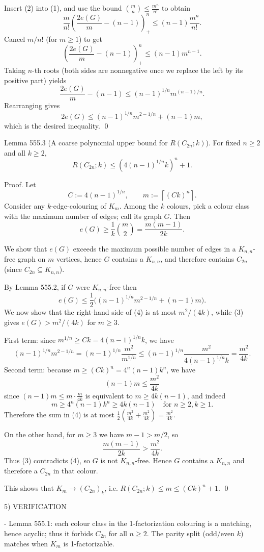 Insert (2) into (1), and use the bound $\binom{m}{n}\le \frac{m^n}{n!}$ to obtain
\[
\frac{m}{n!}\left(\frac{2e(G)}{m}-(n-1)\right)_+^n\le (n-1)\frac{m^n}{n!}.
\]
Cancel $m/n!$ (for $m\ge 1$) to get
\[
\left(\frac{2e(G)}{m}-(n-1)\right)_+^n\le (n-1)m^{n-1}.
\]
Taking $n$-th roots (both sides are nonnegative once we replace the left by its positive part) yields
\[
\frac{2e(G)}{m}-(n-1)\le (n-1)^{1/n} m^{(n-1)/n}.
\]
Rearranging gives
\[
2e(G)\le (n-1)^{1/n} m^{2-1/n}+(n-1)m,
\]
which is the desired inequality.
\qed

Lemma 555.3 (A coarse polynomial upper bound for $R(C_{2n};k)$).
For fixed $n\ge 2$ and all $k\ge 2$,
\[
R(C_{2n};k)\le \left(4(n-1)^{1/n}k\right)^n+1.
\]

Proof.
Let
\[
C:=4(n-1)^{1/n},\qquad m:=\left\lceil (Ck)^n\right\rceil.
\]
Consider any $k$-edge-colouring of $K_m$.
Among the $k$ colours, pick a colour class with the maximum number of edges; call its graph $G$.
Then
\[
e(G)\ge \frac{1}{k}\binom{m}{2}=\frac{m(m-1)}{2k}.
\tag{3}
\]

We show that $e(G)$ exceeds the maximum possible number of edges in a $K_{n,n}$-free graph on $m$ vertices, hence $G$ contains a $K_{n,n}$, and therefore contains $C_{2n}$ (since $C_{2n}\subseteq K_{n,n}$).

By Lemma 555.2, if $G$ were $K_{n,n}$-free then
\[
e(G)\le \frac12\Big((n-1)^{1/n} m^{2-1/n}+(n-1)m\Big).
\tag{4}
\]
We now show that the right-hand side of (4) is at most $m^2/(4k)$, while (3) gives $e(G)>m^2/(4k)$ for $m\ge 3$.

First term:
since $m^{1/n}\ge Ck=4(n-1)^{1/n}k$, we have
\[
(n-1)^{1/n} m^{2-1/n}=(n-1)^{1/n}\frac{m^2}{m^{1/n}}\le (n-1)^{1/n}\frac{m^2}{4(n-1)^{1/n}k}=\frac{m^2}{4k}.
\]
Second term:
because $m\ge (Ck)^n=4^n(n-1)k^n$, we have
\[
(n-1)m\le \frac{m^2}{4k}
\]
since $(n-1)m\le m\cdot \frac{m}{4k}$ is equivalent to $m\ge 4k(n-1)$, and indeed
\[
m\ge 4^n(n-1)k^n\ge 4k(n-1)\quad\text{for }n\ge 2,k\ge 1.
\]
Therefore the sum in (4) is at most $\frac12(\frac{m^2}{4k}+\frac{m^2}{4k})=\frac{m^2}{4k}$.

On the other hand, for $m\ge 3$ we have $m-1>m/2$, so
\[
\frac{m(m-1)}{2k}>\frac{m^2}{4k}.
\]
Thus (3) contradicts (4), so $G$ is not $K_{n,n}$-free.
Hence $G$ contains a $K_{n,n}$ and therefore a $C_{2n}$ in that colour.

This shows that $K_m\to (C_{2n})_k$, i.e. $R(C_{2n};k)\le m\le (Ck)^n+1$.
\qed

5) VERIFICATION

- Lemma 555.1: each colour class in the 1-factorization colouring is a matching, hence acyclic; thus it forbids $C_{2n}$ for all $n\ge 2$. The parity split (odd/even $k$) matches when $K_m$ is 1-factorizable.

